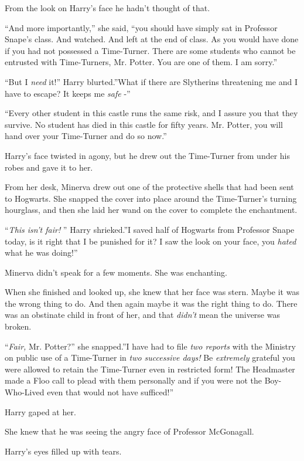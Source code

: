 From the look on Harry's face he hadn't thought of that.

``And more importantly,'' she said, ``you should have simply sat in
Professor Snape's class. And watched. And left at the end of class. As
you would have done if you had not possessed a Time-Turner. There are
some students who cannot be entrusted with Time-Turners, Mr. Potter. You
are one of them. I am sorry.''

``But I \emph{need} it!'' Harry blurted.''What if there are Slytherins
threatening me and I have to escape? It keeps me \emph{safe} -''

``Every other student in this castle runs the same risk, and I assure
you that they survive. No student has died in this castle for fifty
years. Mr. Potter, you will hand over your Time-Turner and do so now.''

Harry's face twisted in agony, but he drew out the Time-Turner from
under his robes and gave it to her.

From her desk, Minerva drew out one of the protective shells that had
been sent to Hogwarts. She snapped the cover into place around the
Time-Turner's turning hourglass, and then she laid her wand on the cover
to complete the enchantment.

``\emph{This isn't fair!} '' Harry shrieked.''I saved half of Hogwarts
from Professor Snape today, is it right that I be punished for it? I saw
the look on your face, you \emph{hated} what he was doing!''

Minerva didn't speak for a few moments. She was enchanting.

When she finished and looked up, she knew that her face was stern. Maybe
it was the wrong thing to do. And then again maybe it was the right
thing to do. There was an obstinate child in front of her, and that
\emph{didn't} mean the universe was broken.

``\emph{Fair,} Mr. Potter?'' she snapped.''I have had to file \emph{two
reports} with the Ministry on public use of a Time-Turner in \emph{two
successive days!} Be \emph{extremely} grateful you were allowed to
retain the Time-Turner even in restricted form! The Headmaster made a
Floo call to plead with them personally and if you were not the
Boy-Who-Lived even that would not have sufficed!''

Harry gaped at her.

She knew that he was seeing the angry face of Professor McGonagall.

Harry's eyes filled up with tears.

